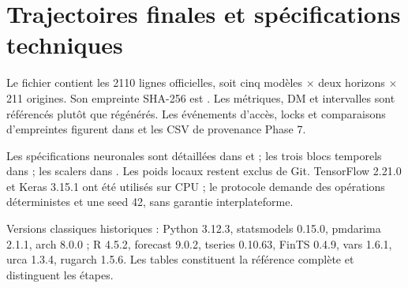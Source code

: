 \section{Trajectoires finales et spécifications techniques}
\label{app:C}




Le fichier  contient les 2110 lignes officielles, soit cinq modèles \(\times\) deux horizons \(\times\) 211 origines. Son empreinte SHA-256 est . Les métriques, DM et intervalles sont référencés plutôt que régénérés. Les événements d’accès, locks et comparaisons d’empreintes figurent dans  et les CSV de provenance Phase 7.



Les spécifications neuronales sont détaillées dans  et  ; les trois blocs temporels dans  ; les scalers dans . Les poids locaux restent exclus de Git. TensorFlow 2.21.0 et Keras 3.15.1 ont été utilisés sur CPU ; le protocole demande des opérations déterministes et une seed 42, sans garantie interplateforme.



Versions classiques historiques : Python 3.12.3, statsmodels 0.15.0, pmdarima 2.1.1, arch 8.0.0 ; R 4.5.2, forecast 9.0.2, tseries 0.10.63, FinTS 0.4.9, vars 1.6.1, urca 1.3.4, rugarch 1.5.6. Les tables  constituent la référence complète et distinguent les étapes.
